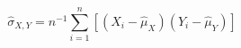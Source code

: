 \begin{equation}
    \hat{\sigma}_{X, Y}
    =
    n^{-1}
    \sum_{i = 1}^{n}
    \left[
    \left(
    X_{i}
    -
    \hat{\mu}_{X}
    \right)
    \left(
    Y_{i}
    -
    \hat{\mu}_{Y}
    \right)
    \right]
    \label{eq:sigmaMatrix-sigmaxyhat}
\end{equation}
